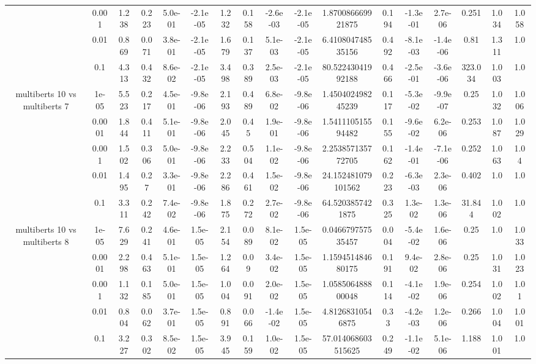\begin{tabular}{|c|c|c|c|c|c|c|c|c|c|c|c|c|c|c|c|c|}
 & 0.001 & 1.238 & 0.223 & 5.0e-01 & -2.1e-05 & 1.232 & 0.158 & -2.6e-03 & -2.1e-05 & 1.870086669921875 & 0.194 & -1.3e-01 & 2.7e-06 & 0.251 & 1.034 & 1.058 \\
 & 0.01 & 0.869 & 0.071 & 3.8e-01 & -2.1e-05 & 1.679 & 0.137 & 5.1e-03 & -2.1e-05 & 6.410804748535156 & 0.492 & -8.1e-03 & -1.4e-06 & 0.81 & 1.311 & 1.0 \\
 & 0.1 & 4.313 & 0.432 & 8.6e-02 & -2.1e-05 & 3.498 & 0.389 & 2.5e-03 & -2.1e-05 & 80.52243041992188 & 0.466 & -2.5e-01 & -3.6e-06 & 323.034 & 1.003 & 1.0 \\
\hline
\multirow{5}{*}{multiberts 10 vs multiberts 7} & 1e-05 & 5.523 & 0.217 & 4.5e-01 & -9.8e-06 & 2.193 & 0.489 & 6.8e-02 & -9.8e-06 & 1.450402498245239 & 0.117 & -5.3e-02 & -9.9e-07 & 0.25 & 1.032 & 1.006 \\
 & 0.0001 & 1.844 & 0.411 & 5.1e-01 & -9.8e-06 & 2.045 & 0.45 & 1.9e-01 & -9.8e-06 & 1.541110515594482 & 0.155 & -9.6e-02 & 6.2e-06 & 0.253 & 1.087 & 1.029 \\
 & 0.001 & 1.502 & 0.306 & 5.0e-01 & -9.8e-06 & 2.233 & 0.504 & 1.1e-02 & -9.8e-06 & 2.253857135772705 & 0.162 & -1.4e-01 & -7.1e-06 & 0.252 & 1.063 & 1.04 \\
 & 0.01 & 1.495 & 0.27 & 3.3e-01 & -9.8e-06 & 2.286 & 0.461 & 1.5e-02 & -9.8e-06 & 24.152481079101562 & 0.223 & -6.3e-03 & 2.3e-06 & 0.402 & 1.0 & 1.0 \\
 & 0.1 & 3.311 & 0.242 & 7.4e-02 & -9.8e-06 & 1.875 & 0.272 & 2.7e-02 & -9.8e-06 & 64.5203857421875 & 0.325 & 1.3e-02 & 1.3e-06 & 31.844 & 1.002 & 1.0 \\
\hline
\multirow{5}{*}{multiberts 10 vs multiberts 8} & 1e-05 & 7.629 & 0.241 & 4.6e-01 & 1.5e-05 & 2.154 & 0.089 & 8.1e-02 & 1.5e-05 & 0.046679757535457 & 0.004 & -5.4e-02 & 1.6e-06 & 0.25 & 1.0 & 1.033 \\
 & 0.0001 & 2.298 & 0.463 & 5.1e-01 & 1.5e-05 & 1.264 & 0.09 & 3.4e-02 & 1.5e-05 & 1.159451484680175 & 0.191 & 9.4e-02 & 2.8e-06 & 0.25 & 1.031 & 1.023 \\
 & 0.001 & 1.132 & 0.185 & 5.0e-01 & 1.5e-05 & 1.004 & 0.091 & 2.0e-02 & 1.5e-05 & 1.058506488800048 & 0.114 & -4.1e-02 & 1.9e-06 & 0.254 & 1.002 & 1.01 \\
 & 0.01 & 0.804 & 0.062 & 3.7e-01 & 1.5e-05 & 0.891 & 0.066 & -1.4e-02 & 1.5e-05 & 4.81268310546875 & 0.33 & -4.2e-03 & 1.2e-06 & 0.266 & 1.004 & 1.001 \\
 & 0.1 & 3.227 & 0.302 & 8.5e-02 & 1.5e-05 & 3.945 & 0.159 & 1.0e-02 & 1.5e-05 & 57.014068603515625 & 0.249 & -1.1e-02 & 5.1e-06 & 1.188 & 1.001 & 1.0 \\

\end{tabular}
